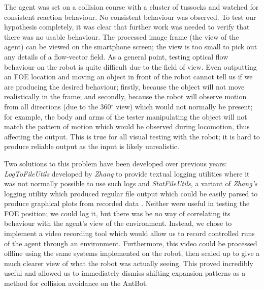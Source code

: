 \documentclass[a4paper,11pt,twoside,openright]{article}
\begin{document}
The agent was set on a collision course with a cluster of tussocks and
watched for consistent reaction behaviour. No consistent behaviour was
observed.  To test our hypothesis completely, it was clear that
further work was needed to verify that there was no usable
behaviour. The processed image frame (the view of the agent) can be
viewed on the smartphone screen; the view is too small to pick out any
details of a flow-vector field. As a general point, testing optical
flow behaviour on the robot is quite difficult due to the field of
view. Even outputting an FOE location and moving an object in front of
the robot cannot tell us if we are producing the desired behaviour;
firstly, because the object will not move realistically in the frame;
and secondly, because the robot will observe motion from all
directions (due to the 360$^\circ$ view) which would not normally be
present; for example, the body and arms of the tester manipulating the
object will not match the pattern of motion which would be observed
during locomotion, thus affecting the output. This is true for all
visual testing with the robot; it is hard to produce reliable output
as the input is likely unrealistic.
\newline\par

Two solutions to this problem have been developed over previous years:
\textit{LogToFileUtils} developed by \textit{Zhang} to provide textual
logging utilities where it was not normally possible to use such logs
\cite{Zhang2017} and \textit{StatFileUtils}, a variant of
\textit{Zhang's} logging utility which produced regular file output
which could be easily parsed to produce graphical plots from recorded
data \cite{Mitchell2018}. Neither were useful in testing the FOE
position; we could log it, but there was be no way of correlating its
behaviour with the agent's view of the environment. Instead, we chose
to implement a video recording tool which would allow us to record
controlled runs of the agent through an environment. Furthermore, this
video could be processed offline using the same systems implemented on
the robot, then scaled up to give a much clearer view of what the
robot was actually seeing.  This proved incredibly useful and allowed
us to immediately dismiss shifting expansion patterns as a method for
collision avoidance on the AntBot.
\newline\par
\end{document}
